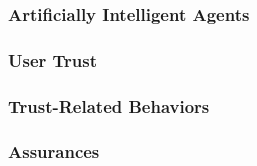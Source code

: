\subsubsection*{Artificially Intelligent Agents} %

\subsubsection*{User Trust} %

\subsubsection*{Trust-Related Behaviors} %

\subsubsection*{Assurances} %


